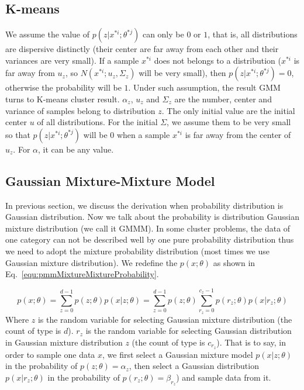 \documentclass[runningheads,openany]{xhlPaper}
\begin{document}
\subsection{K-means}
We assume the value of $p\left( {z|{x^{*i}};{\theta ^{*j}}} \right)$ can only be $0$ or $1$, that is, all distributions are dispersive distinctly (their center are far away from each other and their variances are very small). 
If a sample $x^{*i}$ does not belongs to a distribution ($x^{*i}$ is far away from $u_z$, so $N\left(x^{*i}; u_z, \Sigma_z\right)$ will be very small), then $p\left( {z|{x^{*i}};{\theta ^{*j}}} \right) = 0$, otherwise the probability will be $1$.
Under such assumption, the result GMM turns to K-means cluster result.
$\alpha _z$, $u_z$ and $\Sigma_{z}$ are the number, center and variance of samples belong to distribution $z$.
The only initial value are the initial center $u$ of all distributions. For the initial $\Sigma$, we assume them to be very small so that $p\left( {z|{x^{*i}};{\theta ^{*j}}} \right)$ will be $0$ when a sample $x^{*i}$ is far away from the center of $u_z$.
For $\alpha$, it can be any value.

\subsection{Gaussian Mixture-Mixture Model}
In previous section, we discuss the derivation when probability distribution is Gaussian distribution. Now we talk about the probability is distribution Gaussian mixture distribution (we call it GMMM). In some cluster problems, the data of one category can not be described well by one pure probability distribution thus we need to adopt the mixture probability distribution (most times we use Gaussian mixture distribution). We redefine the $p\left(x; \theta\right)$ as shown in Eq.~\ref{equ:pmmMixtureMixtureProbability}.

\begin{equation}
\label{equ:pmmMixtureMixtureProbability}
p\left( {x;\theta } \right) = \sum\limits_{z = 0}^{d - 1} {p\left( {z;\theta } \right)p\left( {x|z;\theta } \right)}  = \sum\limits_{z = 0}^{d - 1} {p\left( {z;\theta } \right)\sum\limits_{{r_z} = 0}^{{c_z} - 1} {p\left( {{r_z};\theta } \right)p\left( {x|{r_z};\theta } \right)} } 
\end{equation}
Where $z$ is the random variable for selecting Gaussian mixture distribution (the count of type is $d$). $r_{z}$ is the random variable for selecting Gaussian distribution in Gaussian mixture distribution $z$ (the count of type is $c_{r_{z}}$). That is to say, in order to sample one data $x$, we first select a Gaussian mixture model $p\left( {x|z;\theta } \right)$ in the probability of $p\left( {z;\theta } \right) = \alpha_{z}$, then select a Gaussian distribution ${p\left( {x|{r_z};\theta } \right)}$ in the probability of $p\left( {{r_z};\theta } \right) = \beta_{r_z}$) and sample data from it. 
\end{document}
